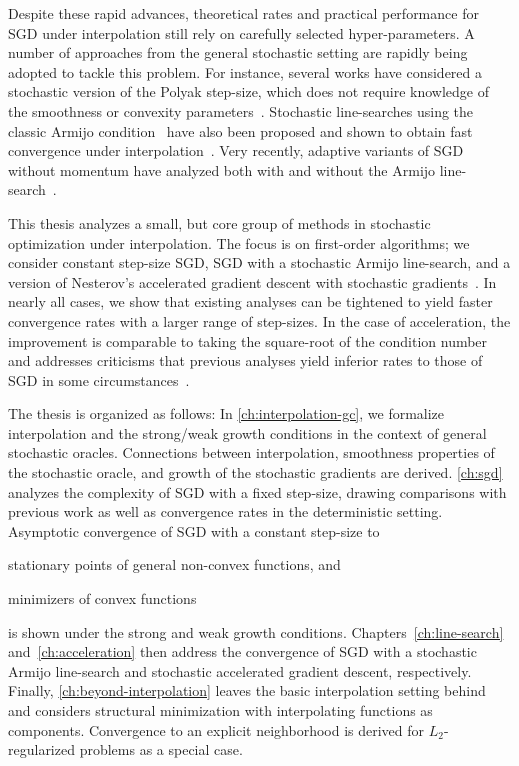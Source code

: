 Despite these rapid advances, theoretical rates and practical performance for \ac{SGD} under interpolation still rely on carefully selected hyper-parameters.
A number of approaches from the general stochastic setting are rapidly being adopted to tackle this problem.
For instance, several works have considered a stochastic version of the Polyak step-size, which does not require knowledge of the smoothness or convexity parameters~\citep{loizou2020sps, berrada2019training}. 
Stochastic line-searches using the classic Armijo condition~\citep{armijo1966ls} have also been proposed and shown to obtain fast convergence under interpolation~\citep{vaswani2019painless}.
Very recently, adaptive variants of \ac{SGD} without momentum have analyzed both with and without the Armijo line-search~\citep{vaswani2020adaptive}.

This thesis analyzes a small, but core group of methods in stochastic optimization under interpolation.
The focus is on first-order algorithms; we consider constant step-size \ac{SGD}, \ac{SGD} with a stochastic Armijo line-search, and a version of Nesterov's accelerated gradient descent with stochastic gradients~\citep{nesterov2004lectures}. 
In nearly all cases, we show that existing analyses can be tightened to yield faster convergence rates with a larger range of step-sizes. 
In the case of acceleration, the improvement is comparable to taking the square-root of the condition number and addresses criticisms that previous analyses yield inferior rates to those of \ac{SGD} in some circumstances~\cite{liu2020accelerating}. 

The thesis is organized as follows: 
In \autoref{ch:interpolation-gc}, we formalize interpolation and the strong/weak growth conditions in the context of general stochastic oracles. 
Connections between interpolation, smoothness properties of the stochastic oracle, and growth of the stochastic gradients are derived.
\autoref{ch:sgd} analyzes the complexity of \ac{SGD} with a fixed step-size, drawing comparisons with previous work as well as convergence rates in the deterministic setting. 
Asymptotic convergence of SGD with a constant step-size to
\begin{inparaenum}[(i)]
\item stationary points of general non-convex functions, and
\item minimizers of convex functions 
\end{inparaenum}
is shown under the strong and weak growth conditions.
Chapters~\ref{ch:line-search} and~\ref{ch:acceleration} then address the convergence of \ac{SGD} with a stochastic Armijo line-search and stochastic accelerated gradient descent, respectively. 
Finally, \autoref{ch:beyond-interpolation} leaves the basic interpolation setting behind and considers structural minimization with interpolating functions as components. 
Convergence to an explicit neighborhood is derived for \( L_2 \)-regularized problems as a special case. 


